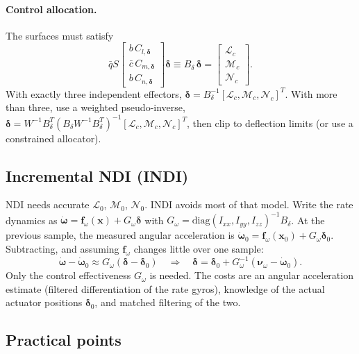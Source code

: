 \documentclass[11pt]{report}
\numberwithin{equation}{chapter}
\newcommand{\vb}[1]{\bm{#1}}
\begin{document}
\paragraph{Control allocation.} The surfaces must satisfy
\begin{equation}
  \bar q S\begin{bmatrix} b\,C_{l,\vb\delta}\\ \bar c\,C_{m,\vb\delta}\\ b\,C_{n,\vb\delta}\end{bmatrix}\vb\delta
  \equiv B_\delta\,\vb\delta
  = \begin{bmatrix}\mathcal L_c\\ \mathcal M_c\\ \mathcal N_c\end{bmatrix}.
\end{equation}
With exactly three independent effectors, $\vb\delta = B_\delta^{-1}[\mathcal L_c,\mathcal M_c,\mathcal N_c]^T$.
With more than three, use a weighted pseudo-inverse,
$\vb\delta = W^{-1}B_\delta^T\left(B_\delta W^{-1}B_\delta^T\right)^{-1}[\mathcal L_c,\mathcal M_c,\mathcal N_c]^T$,
then clip to deflection limits (or use a constrained allocator).

\subsection{Incremental NDI (INDI)}

NDI needs accurate $\mathcal L_0$, $\mathcal M_0$, $\mathcal N_0$. INDI avoids most of that
model. Write the rate dynamics as $\dot{\vb\omega} = \vb f_\omega(\vb x) + G_\omega\vb\delta$
with $G_\omega = \mathrm{diag}(I_{xx},I_{yy},I_{zz})^{-1}B_\delta$. At the previous sample,
the measured angular acceleration is $\dot{\vb\omega}_0 = \vb f_\omega(\vb x_0) + G_\omega\vb\delta_0$.
Subtracting, and assuming $\vb f_\omega$ changes little over one sample:
\begin{equation}
  \dot{\vb\omega} - \dot{\vb\omega}_0 \approx G_\omega\left(\vb\delta - \vb\delta_0\right)
  \quad\Rightarrow\quad
  \vb\delta = \vb\delta_0 + G_\omega^{-1}\left(\vb\nu_\omega - \dot{\vb\omega}_0\right).
\end{equation}
Only the control effectiveness $G_\omega$ is needed. The costs are an angular acceleration
estimate (filtered differentiation of the rate gyros), knowledge of the actual actuator
positions $\vb\delta_0$, and matched filtering of the two.

\subsection{Practical points}
\end{document}
